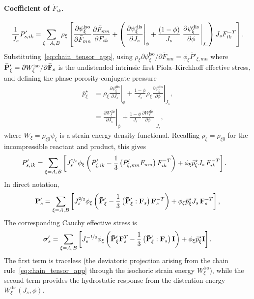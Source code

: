 \documentclass[11pt]{article}
\begin{document}
\paragraph{Coefficient of $\dot{F}_{ik}$.}
%
\begin{align}
  \frac{1}{J_s} P'_{s,ik} = \sum_{\xi=A,B} \rho_\xi \left[\frac{\partial \psi^{\text{iso}}_\xi}{\partial \bar{F}_{mn}} \frac{\partial \bar{F}_{mn}}{\partial F_{ik}} + \left(\left.\frac{\partial \psi^{\text{dis}}_\xi}{\partial J_s}\right\vert_\phi + \frac{(1-\phi)}{J_s}\left.\frac{\partial \psi^{\text{dis}}_\xi}{\partial \phi}\right\vert_{J_s}\right) J_s F^{-T}_{ik}\right].
  \notag
\end{align}
%
Substituting~\eqref{eq:chain_tensor_app}, using $\rho_\xi \partial\psi^{\text{iso}}_\xi / \partial\bar{F}_{mn} = \phi_\xi \bar{P}'_{\xi,mn}$ where $\mathbf{\bar P}'_\xi = \partial W^{\text{iso}}_\xi / \partial\mathbf{\bar F}_s$ is the undistended intrinsic first Piola--Kirchhoff effective stress, and defining the phase porosity-conjugate pressure 
%
\begin{align}
  \bar{p}^\star_\xi &= \left.\rho_\xi \frac{\partial \psi^{\text{dis}}_\xi}{\partial J_s}\right\vert_\phi + \frac{1-\phi}{J_s}\left.\rho_\xi\frac{\partial \psi^{\text{dis}}_\xi}{\partial\phi}\right\vert_{J_s}, \\
   &= \left.\frac{\partial W^{\text{dis}}_\xi}{\partial J_s}\right\vert_\phi + \frac{1-\phi}{J_s}\left.\frac{\partial W^{\text{dis}}_\xi}{\partial\phi}\right\vert_{J_s},
\end{align}
where $W_\xi = \rho_{\xi0} \psi_\xi$ is a strain energy density functional. Recalling $\rho_{\xi} = \rho_{\xi 0}$ for the incompressible reactant and product, this gives
%
\begin{align}
  P'_{s,ik} &= \sum_{\xi=A,B} \left[J_s^{\nicefrac{2}{3}}  \phi_\xi \left(\bar{P}'_{\xi,ik} - \frac{1}{3}\left(\bar{P}'_{\xi,mn} F_{mn}\right) F^{-T}_{ik}\right) +  \phi_\xi \bar{p}^\star_\xi  J_s\, F^{-T}_{ik}\right]. \notag
\end{align}
%
In direct notation,
%
\begin{align}
  \mathbf{P}'_s = \sum_{\xi=A,B} \left[J_s^{\nicefrac{2}{3}} \phi_\xi \left(\mathbf{\bar P}'_\xi - \frac{1}{3}\left(\mathbf{\bar P}'_\xi : \mathbf{F}_s\right) \mathbf{F}_s^{-T}\right) + \phi_\xi \bar{p}^\star_\xi J_s\, \mathbf{F}_s^{-T}\right],
  \label{eq:P_CN_direct}
\end{align}
%
The corresponding Cauchy effective stress is
%
\begin{align}
  \boldsymbol{\sigma}'_s = \sum_{\xi=A,B}\left[J_s^{-\nicefrac{1}{3}}  \phi_\xi \left(\mathbf{\bar P}'_\xi \mathbf{F}_s^T - \frac{1}{3}\left(\mathbf{\bar P}'_\xi : \mathbf{F}_s\right) \mathbf{I}\right) + \phi_\xi \bar{p}^\star_\xi \mathbf{I}\right].
  \notag
\end{align}
%
The first term is traceless (the deviatoric projection arising from the chain rule~\eqref{eq:chain_tensor_app} through the isochoric strain energy $W^{\text{iso}}_\xi$), while the second term provides the hydrostatic response from the distention energy $W^{\text{dis}}_\xi(J_s, \phi)$.
\end{document}
